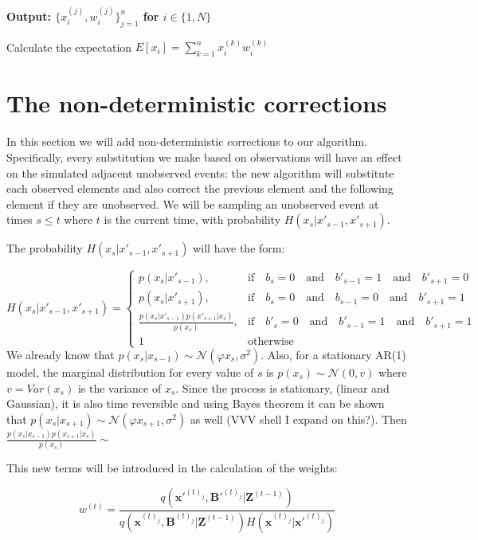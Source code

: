 \documentclass[11pt,a4paper]{article}
\renewcommand{\vec}[1]{\mathbf{#1}}
\begin{document}
{\begin{algorithm}[H]
\begin{algorithmic}
\begin{enumerate}
\end{enumerate}

\State  \bf{Output:} \normalfont $\Big \{ x_{i}^{(j)} , w_{i}^{(j)} \Big \}_{j = 1}^{n}$ for $i \in \{ 1, N \}$

\item Calculate the expectation  $E[x_i] = \sum_{k=1}^{n} x^{(k)}_i w_{i}^{(k)}$
  
 \end{algorithmic}
\end{algorithm}

\section{The non-deterministic corrections}

In this section we will add non-deterministic corrections to our algorithm. Specifically, every substitution we make based on observations will have an effect on the simulated adjacent unobserved events: the new algorithm will substitute each observed elements and also correct the previous element and the following element if they are unobserved. We will be sampling an unobserved event at times $s\leq t$ where $t$ is the current time, with probability $H(x_s|x'_{s-1}, x'_{s+1})$.

The probability $H(x_s|x'_{s-1}, x'_{s+1})$ will have the form:

\[
H(x_s|x'_{s-1}, x'_{s+1}) = \begin{cases} p(x_s|x'_{s-1}), & \mbox{if} \quad b_s = 0  \quad \mbox{and} \quad b'_{s-1} = 1 \quad \mbox{and} \quad b'_{s+1} = 0\\ 
p(x_s|x'_{s+1}), & \mbox{if} \quad b_s = 0  \quad \mbox{and} \quad b_{s-1} = 0 \quad \mbox{and} \quad b'_{s+1} = 1\\
\frac{p(x_s|x'_{s-1})p(x'_{s+1}|x_s)}{p(x_s)}, & \mbox{if} \quad b'_s = 0  \quad \mbox{and} \quad b'_{s-1} = 1 \quad \mbox{and} \quad b'_{s+1} = 1\\
1 & \mbox{otherwise} \end{cases}
\]
We already know that $p(x_s|x_{s-1}) \sim \mathcal{N} (\varphi x_{s}, \sigma^{2})$. Also, for a stationary AR(1) model, the marginal distribution for every value of $s$ is $p(x_{s}) \sim \mathcal{N}(0, v)$ where $v = Var(x_s)$ is the variance of $x_s$. Since the process is stationary, (linear and Gaussian), it is also time reversible and using Bayes theorem it can be shown that $p(x_{s}|x_{s+1}) \sim \mathcal{N} (\varphi x_{s+1}, \sigma^{2})$ as well (VVV shell I expand on this?).
Then $\frac{p(x_s|x_{s-1})p(x_{s+1}|x_s)}{p(x_s)} \sim $

This new terms will be introduced in the calculation of the weights:

\[
w^{(t)} = \frac{q(\vec{x'}^{(t)_j}, \vec{B'}^{(t)_j} | \vec{Z}^{(t-1)}) }{q(\vec{x}^{(t)_j}, \vec{B}^{(t)_j} | \vec{Z}^{(t-1)}) H(\vec{x}^{(t)_j}|\vec{x'}^{(t)_j}) }
\]

}
\end{document}
